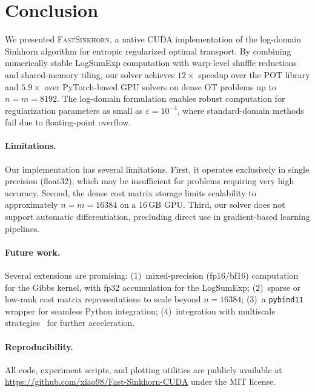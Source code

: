 
\section{Conclusion}
\label{sec:conclusion}

We presented \textsc{FastSinkhorn}, a native CUDA implementation of the log-domain Sinkhorn algorithm for entropic regularized optimal transport. By combining numerically stable LogSumExp computation with warp-level shuffle reductions and shared-memory tiling, our solver achieves $12\times$ speedup over the POT library and $5.9\times$ over PyTorch-based GPU solvers on dense OT problems up to $n = m = 8192$. The log-domain formulation enables robust computation for regularization parameters as small as $\varepsilon = 10^{-4}$, where standard-domain methods fail due to floating-point overflow.

\paragraph{Limitations.}
Our implementation has several limitations. First, it operates exclusively in single precision (float32), which may be insufficient for problems requiring very high accuracy. Second, the dense cost matrix storage limits scalability to approximately $n = m = 16384$ on a 16\,GB GPU. Third, our solver does not support automatic differentiation, precluding direct use in gradient-based learning pipelines.

\paragraph{Future work.}
Several extensions are promising: (1)~mixed-precision (fp16/bf16) computation for the Gibbs kernel, with fp32 accumulation for the LogSumExp; (2)~sparse or low-rank cost matrix representations to scale beyond $n = 16384$; (3)~a \texttt{pybind11} wrapper for seamless Python integration; (4)~integration with multiscale strategies~\citep{schmitzer2019stabilized} for further acceleration.

\paragraph{Reproducibility.}
All code, experiment scripts, and plotting utilities are publicly available at \url{https://github.com/xiao98/Fast-Sinkhorn-CUDA} under the MIT license.
